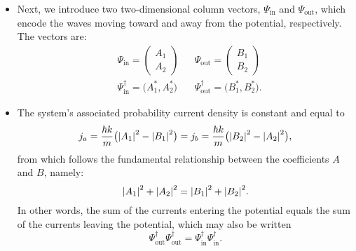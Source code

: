 \documentclass[11pt, a4paper]{article}
\begin{document}
\begin{itemize}
    \item Next, we introduce two two-dimensional column vectors, $ \Psi_{\text{in}} $ and $ \Psi_{\text{out}} $, which encode the waves moving toward and away from the potential, respectively. The vectors are:
    \begin{align*}
        & \Psi_{\text{in}} = 
        \begin{pmatrix}
            A_{1}\\
            A_{2}
        \end{pmatrix}
        && \Psi_{\text{out}} = 
        \begin{pmatrix}
            B_{1} \\
            B_{2}
        \end{pmatrix}\\
        & \Psi_{\text{in}}^{\dagger} = \big( A_{1}^{*}, A_{2}^{*} \big)
        && \Psi_{\text{out}}^{\dagger} = \big( B_{1}^{*}, B_{2}^{*} \big).
    \end{align*}

    \item The system's associated probability current density is constant and equal to
    \begin{equation*}
        j_{a} = \frac{\hbar k}{m} \big( \abs{A_{1}}^{2} - \abs{B_{1}}^{2} \big) = j_{b} = \frac{\hbar k}{m} \big( \abs{B_{2}}^{2} - \abs{A_{2}}^{2} \big),
    \end{equation*}
    from which follows the fundamental relationship between the coefficients $ A $ and $ B $, namely:
    \begin{equation*}
        \abs{A_{1}}^{2} + \abs{A_{2}}^{2} = \abs{B_{1}}^{2} + \abs{B_{2}}^{2}.
    \end{equation*}
    In other words, the sum of the currents entering the potential equals the sum of the currents leaving the potential, which may also be written
    \begin{equation*}
        \Psi_{\text{out}}^{\dagger} \Psi_{\text{out}}^{\dagger} = \Psi_{\text{in}}^{\dagger} \Psi_{\text{in}}^{\dagger}.
    \end{equation*}
    
\end{itemize}
\end{document}

